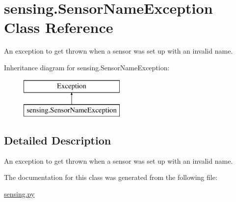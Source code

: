 \hypertarget{classsensing_1_1_sensor_name_exception}{\section{sensing.\-Sensor\-Name\-Exception Class Reference}
\label{classsensing_1_1_sensor_name_exception}
}


An exception to get thrown when a sensor was set up with an invalid name.  


Inheritance diagram for sensing.\-Sensor\-Name\-Exception\-:\begin{figure}[H]
\begin{center}
\leavevmode
\includegraphics[height=2.000000cm]{classsensing_1_1_sensor_name_exception}
\end{center}
\end{figure}


\subsection{Detailed Description}
An exception to get thrown when a sensor was set up with an invalid name. 

The documentation for this class was generated from the following file\-:\begin{DoxyCompactItemize}
\item 
\hyperlink{sensing_8py}{sensing.\-py}\end{DoxyCompactItemize}
